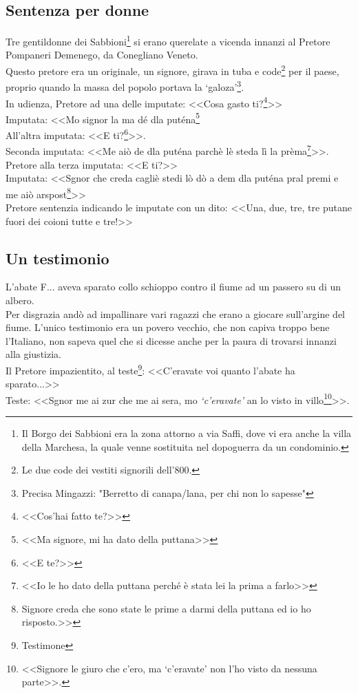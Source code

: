 \subsection{Sentenza per donne}
Tre gentildonne dei Sabbioni\footnote{Il Borgo dei Sabbioni era la zona attorno a via Saffi, dove vi era anche la villa della Marchesa, la quale venne sostituita nel dopoguerra da un condominio.} si erano querelate a vicenda innanzi al Pretore Pompaneri Demenego, da Conegliano Veneto.\\
\indent Questo pretore era un originale, un signore, girava in tuba e code\footnote{Le due code dei vestiti signorili dell'800.} per il paese, proprio quando la massa del popolo portava la `galoza'\footnote{Precisa Mingazzi: "Berretto di canapa/lana, per chi non lo sapesse"}.\\
\indent In udienza, Pretore ad una delle imputate: <<Cosa gasto ti?\footnote{<<Cos'hai fatto te?>>}>>\\
\indent Imputata: <<Mo signor la ma dé dla puténa\footnote{<<Ma signore, mi ha dato della puttana>>}\\
\indent All'altra imputata: <<E ti?\footnote{<<E te?>>}>>.\\
\indent Seconda imputata: <<Me aiò de dla puténa parchè lè steda lì la prèma\footnote{<<Io le ho dato della puttana perché è stata lei la prima a farlo>>}>>.\\
\indent Pretore alla terza imputata: <<E ti?>>\\
\indent Imputata: <<Sgnor che creda cagliè stedi lò dò a dem dla puténa pral premi e me aiò arspost\footnote{Signore creda che sono state le prime a darmi della puttana ed io ho risposto.>>}>>\\
\indent Pretore sentenzia indicando le imputate con un dito: <<Una, due, tre, tre putane fuori dei coioni tutte e tre!>>

\subsection{Un testimonio}
L'abate F\:.\:.\:. aveva sparato collo schioppo contro il fiume ad un passero su di un albero.\\
\indent Per disgrazia andò ad impallinare vari ragazzi che erano a giocare sull'argine del fiume. L'unico testimonio era un povero vecchio, che non capiva troppo bene l'Italiano, non sapeva quel che si dicesse anche per la paura di trovarsi innanzi alla giustizia.	\\
\indent Il Pretore impazientito, al teste\footnote{Testimone}: <<C'eravate voi quanto l'abate ha sparato...>>\\
\indent Teste: <<Sgnor me ai zur che me ai sera, mo \emph{`c'eravate'} an lo visto in villo\footnote{<<Signore le giuro che c'ero, ma `c'eravate' non l'ho visto da nessuna parte>>.}>>.


